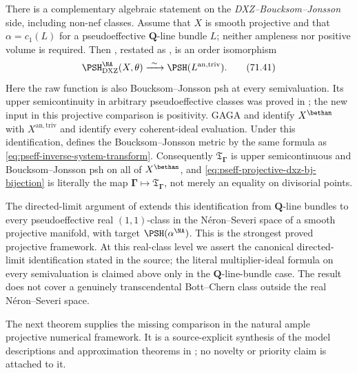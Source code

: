 There is a complementary algebraic statement on the
\emph{DXZ--Boucksom--Jonsson} side, including non-nef classes.  Assume that $X$ is smooth
projective and that
$\alpha=c_1(L)$ for a pseudoeffective $\mathbf Q$-line bundle $L$;
neither ampleness nor positive volume is required.  Then
\cite[Theorem~3.14]{DXZ23}, restated as , is an order
isomorphism
\[
 \PSH^{\NA}_{\mathrm{DXZ}}(X,\theta)
 \xrightarrow{\ \sim\ }
 \PSH(L^{\mathrm{an,triv}}).
\tag{71.41}\label{eq:pseff-projective-dxz-bj-bijection}
\]
Here the raw function is also Boucksom--Jonsson psh at every
semivaluation. Its upper semicontinuity in arbitrary pseudoeffective
classes was proved in ; the new
input in this projective comparison is positivity. GAGA and
 identify
$X^{\bethan}$ with $X^{\mathrm{an,triv}}$ and identify every
coherent-ideal evaluation.  Under this identification,
\cite[formula~(3.8) and Theorem~3.12]{Xia23Operations} defines the
Boucksom--Jonsson metric by the same formula as
\eqref{eq:pseff-inverse-system-transform}.  Consequently
$\mathfrak T_{\boldsymbol\Gamma}$ is upper semicontinuous and
Boucksom--Jonsson psh on all of $X^{\bethan}$, and
\eqref{eq:pseff-projective-dxz-bj-bijection} is literally the map
$\boldsymbol\Gamma\mapsto\mathfrak T_{\boldsymbol\Gamma}$, not merely
an equality on divisorial points.

The directed-limit argument of
\cite[Remark~3.15]{DXZ23} extends this identification from
$\mathbf Q$-line bundles to every pseudoeffective real
$(1,1)$-class in the N\'eron--Severi space of a smooth projective
manifold, with target
$\PSH(\alpha^{\NA})$.  This is the strongest proved projective
framework.  At this real-class level we assert the canonical
directed-limit identification stated in the source; the literal
multiplier-ideal formula on every semivaluation is claimed above only in
the $\mathbf Q$-line-bundle case.  The result does not cover a genuinely
transcendental Bott--Chern class outside the real N\'eron--Severi space.

The next theorem supplies the missing comparison in the natural ample
projective numerical framework.  It is a source-explicit synthesis of the
model descriptions and approximation theorems in
\cite{MP24,BJ22,DXZ23}; no novelty or priority claim is attached to it.

